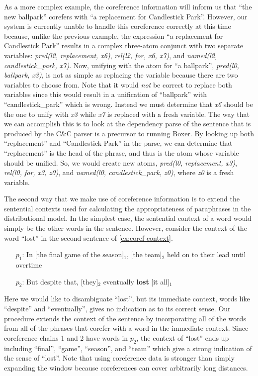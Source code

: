 As a more complex example, the coreference information will inform us that
``the new ballpark'' corefers with ``a replacement for Candlestick Park''.
However, our system is currently unable to handle this coreference correctly at
this time because, unlike the previous example, the expression ``a replacement
for Candlestick Park'' results in a complex three-atom conjunct with two 
separate variables: {\it pred(l2, replacement, x6)}, {\it rel(l2, for, x6, x7)}, and 
{\it named(l2, candlestick\_park, x7)}.  Now, unifying with the atom for ``a
ballpark'', {\it pred(l0, ballpark, x3)}, is not as simple as replacing the
variable because there are two variables to choose from.  Note that it would 
{\it not} be correct to replace
both variables since this would result in a unification of ``ballpark'' with
``candlestick\_park'' which is wrong.  Instead we must determine that {\it x6}
should be the one to unify with {\it x3} while {\it x7} is replaced with a fresh
variable.  The way that we can accomplish this is to look at the dependency
parse of the sentence that is produced by the C\&C parser is a precursor to running
Boxer.  By looking up both ``replacement'' and ``Candlestick Park'' in the
parse, we can determine that ``replacement'' is the head of the phrase, and thus
is the atom whose variable should be unified.  So, we would create new atoms,
{\it pred(l0, replacement, x3)}, {\it rel(l0, for, x3, z0)}, and 
{\it named(l0, candlestick\_park, z0)}, where {\it z0} is a fresh variable.


The second way that we make use of coreference information is to extend the
sentential contexts used for calculating the appropriateness of paraphrases in
the distributional model.  In the simplest case, the sentential context of a
word would simply be the other words in the sentence.  However, consider the
context of the word ``lost'' in the second sentence of \eqref{ex:coref-context}.  

\begin{example}\label{ex:coref-context}
\begin{itemize}
  \item[$p_1$:] In [the final game of the season]$_1$, [the team]$_2$ held on to their lead until overtime
  \item[$p_2$:] But despite that, [they]$_2$ eventually {\bf lost} [it all]$_1$
\end{itemize}
\end{example}

Here we would like to disambiguate ``lost'', but its immediate context, words
like ``despite'' and ``eventually'', gives no indication as to its correct
sense. Our procedure extends the context of the sentence by incorporating all of
the words from all of the phrases that corefer with a word in the immediate
context.  Since coreference chains 1 and 2 have words in $p_2$, the context of
``lost'' ends up including ``final'', ``game'', ``season'', and ``team'' which
give a strong indication of the sense of ``lost''.
Note that using coreference data is stronger than simply expanding the window
because coreferences can cover arbitrarily long distances.

